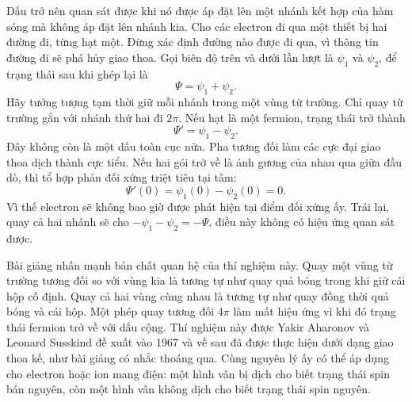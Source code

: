 Dấu trở nên quan sát được khi nó được áp đặt lên một nhánh kết hợp của hàm sóng mà không áp đặt lên nhánh kia. Cho các electron đi qua một thiết bị hai đường đi, từng hạt một. Đừng xác định đường nào được đi qua, vì thông tin đường đi sẽ phá hủy giao thoa. Gọi biên độ trên và dưới lần lượt là \(\psi_1\) và \(\psi_2\), để trạng thái sau khi ghép lại là
\begin{equation}
\Psi=\psi_1+\psi_2.
\end{equation}
Hãy tưởng tượng tạm thời giữ mỗi nhánh trong một vùng từ trường. Chỉ quay từ trường gắn với nhánh thứ hai đi \(2\pi\). Nếu hạt là một fermion, trạng thái trở thành
\begin{equation}
\Psi'=\psi_1-\psi_2.
\end{equation}
Đây không còn là một dấu toàn cục nữa. Pha tương đối làm các cực đại giao thoa dịch thành cực tiểu. Nếu hai gói trở về là ảnh gương của nhau qua giữa đầu dò, thì tổ hợp phản đối xứng triệt tiêu tại tâm:
\begin{equation}
\Psi'(0)=\psi_1(0)-\psi_2(0)=0.
\end{equation}
Vì thế electron sẽ không bao giờ được phát hiện tại điểm đối xứng ấy. Trái lại, quay cả hai nhánh sẽ cho \(-\psi_1-\psi_2=-\Psi\), điều này không có hiệu ứng quan sát được.

Bài giảng nhấn mạnh bản chất quan hệ của thí nghiệm này. Quay một vùng từ trường tương đối so với vùng kia là tương tự như quay quả bóng trong khi giữ cái hộp cố định. Quay cả hai vùng cùng nhau là tương tự như quay đồng thời quả bóng và cái hộp. Một phép quay tương đối \(4\pi\) làm mất hiệu ứng vì khi đó trạng thái fermion trở về với dấu cộng. Thí nghiệm này được Yakir Aharonov và Leonard Susskind đề xuất vào 1967 và về sau đã được thực hiện dưới dạng giao thoa kế, như bài giảng có nhắc thoáng qua. Cùng nguyên lý ấy có thể áp dụng cho electron hoặc ion mang điện: một hình vân bị dịch cho biết trạng thái spin bán nguyên, còn một hình vân không dịch cho biết trạng thái spin nguyên.

\begin{classroomqa}
\end{classroomqa}

\begin{classroomqa}
\end{classroomqa}


